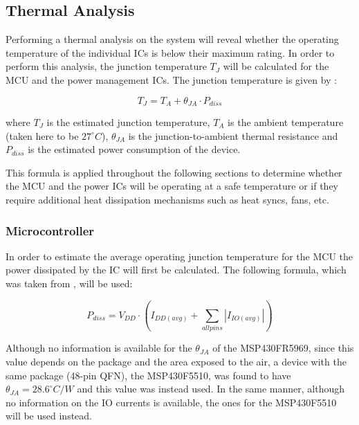 \subsection{Thermal Analysis}
Performing a thermal analysis on the system will reveal whether the operating temperature of the individual ICs is below their maximum rating.  In order to perform this analysis, the junction temperature $T_J$ will be calculated for the MCU and the power management ICs.  The junction temperature is given by \cite[419]{Jimenez2013}:

\[T_J = T_A + \theta_{JA} \cdot P_{diss}\]

where $T_J$ is the estimated junction temperature, $T_A$ is the ambient temperature (taken here to be $27^\circ C$), $\theta_{JA}$ is the junction-to-ambient thermal resistance and $P_{diss}$ is the estimated power consumption of the device. 

This formula is applied throughout the following sections to determine whether the MCU and the power ICs will be operating at a safe temperature or if they require additional heat dissipation mechanisms such as heat syncs, fans, etc.

\subsubsection{Microcontroller}
In order to estimate the average operating junction temperature for the MCU the power dissipated by the IC will first be calculated.  The following formula, which was taken from \cite[419]{Jimenez2013}, will be used:

\[P_{diss} = V_{DD} \cdot \left(I_{DD(avg)} + \sum_{allpins} |I_{IO(avg)}| \right)\]

Although no information is available for the $\theta_{JA}$ of the MSP430FR5969, since this value depends on the package and the area exposed to the air, a device with the same package (48-pin QFN), the MSP430F5510, was found to have $\theta_{JA} = 28.6^\circ C/W$ and this value was instead used.  In the same manner, although no information on the IO currents is available, the ones for the MSP430F5510 will be used instead.

